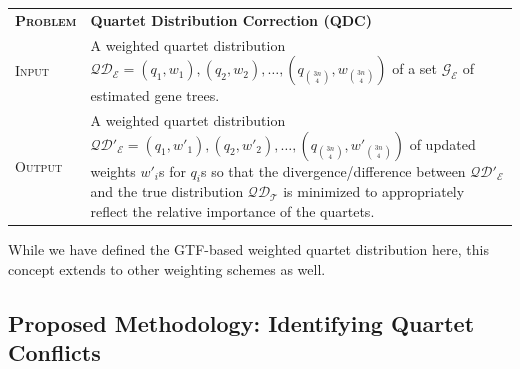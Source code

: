 \documentclass[10pt,a4paper]{article}
\begin{document}
\vspace{0.3cm}
\begin{tabular}{p{1.8cm}p{12cm}}
\textbf{\textsc{Problem}} &\textbf{Quartet Distribution Correction (QDC)}\\
\textsc{Input} & A weighted quartet distribution $\mathcal{QD_E} = (q_1,w_1), (q_2,w_2), \ldots, (q_{3n \choose 4},w_{3n \choose 4})$ of a set $\mathcal{G_E}$ of estimated gene trees. \\
\textsc{Output} & A weighted quartet distribution $\mathcal{QD'_E} = (q_1,w'_1), (q_2,w'_2), \ldots, (q_{3n \choose 4}, w'_{3n \choose 4})$ of updated weights $w'_i$s for $q_i$s so that the divergence/difference between $\mathcal{QD'_E}$ and the true distribution $\mathcal{QD_T}$ is minimized to appropriately reflect the relative importance of the quartets.
\end{tabular}

While we have defined the GTF-based weighted quartet distribution here, this concept extends to other weighting schemes as well. %

\subsection{Proposed Methodology: Identifying Quartet Conflicts}
\label{sec:qt-conflict}
\end{document}
